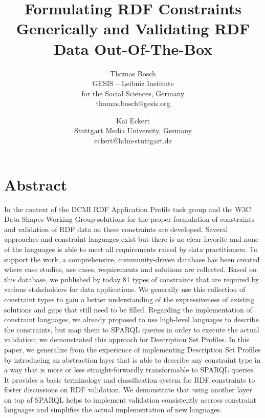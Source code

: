 \documentclass[a4paper,fontsize=11pt]{scrartcl}
\date{}
\begin{document}
\title{\vspace{-1em}Formulating RDF Constraints Generically and Validating RDF Data Out-Of-The-Box}

\author{Thomas Bosch\\GESIS – Leibniz Institute \\for the Social Sciences, Germany\\thomas.bosch@gesis.org \and Kai Eckert\\Stuttgart Media University, Germany\\eckert@hdm-stuttgart.de}

\maketitle
\vspace{-3em}
\section*{Abstract}
In the context of the DCMI RDF Application Profile task group and the W3C Data Shapes Working Group solutions for the proper formulation of constraints and validation of RDF data on these constraints are developed. Several approaches and constraint languages exist but there is no clear favorite and none of the languages is able to meet all requirements raised by data practitioners.
To support the work, a comprehensive, community-driven database has been created where case studies, use cases, requirements and solutions are collected. Based on this database,
we published by today 81 types of constraints that are required by various stakeholders for data applications. We generally use this collection of constraint types to gain a better understanding of the expressiveness of existing solutions and gaps that still need to be filled. 
Regarding the implementation of constraint languages, we already proposed to use high-level languages to describe the constraints, but map them to SPARQL queries in order to execute the actual validation; we demonstrated this approach for Description Set Profiles.
In this paper, we generalize from the experience of implementing Description Set Profiles by introducing an abstraction layer that is able to describe any constraint type in a way that is more or less straight-forwardly transformable to SPARQL queries. 
It provides a basic terminology and classification system for RDF constraints to foster discussions on RDF validation.
We demonstrate that using another layer on top of SPARQL helps to implement validation consistently accross constraint languages and simplifies the actual implementation of new languages.
\end{document}
